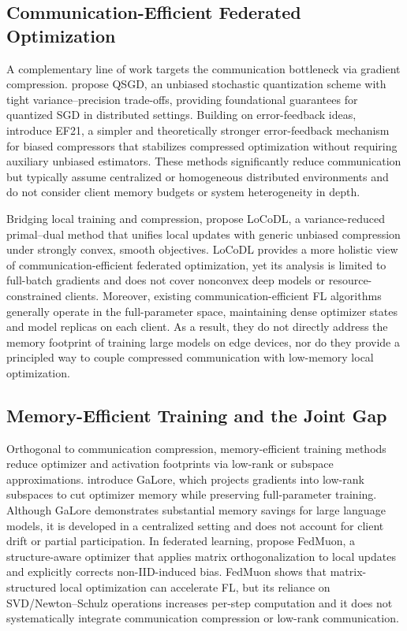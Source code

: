 \documentclass[11pt]{article}
\begin{document}
\subsection{Communication-Efficient Federated Optimization}

A complementary line of work targets the communication bottleneck via gradient compression. \citet{alistarh2016qsgd} propose QSGD, an unbiased stochastic quantization scheme with tight variance–precision trade-offs, providing foundational guarantees for quantized SGD in distributed settings. Building on error-feedback ideas, \citet{richtárik2021simpler} introduce EF21, a simpler and theoretically stronger error-feedback mechanism for biased compressors that stabilizes compressed optimization without requiring auxiliary unbiased estimators. These methods significantly reduce communication but typically assume centralized or homogeneous distributed environments and do not consider client memory budgets or system heterogeneity in depth.

Bridging local training and compression, \citet{condat2024locodl} propose LoCoDL, a variance-reduced primal–dual method that unifies local updates with generic unbiased compression under strongly convex, smooth objectives. LoCoDL provides a more holistic view of communication-efficient federated optimization, yet its analysis is limited to full-batch gradients and does not cover nonconvex deep models or resource-constrained clients. Moreover, existing communication-efficient FL algorithms generally operate in the full-parameter space, maintaining dense optimizer states and model replicas on each client. As a result, they do not directly address the memory footprint of training large models on edge devices, nor do they provide a principled way to couple compressed communication with low-memory local optimization.

\subsection{Memory-Efficient Training and the Joint Gap}

Orthogonal to communication compression, memory-efficient training methods reduce optimizer and activation footprints via low-rank or subspace approximations. \citet{zhao2024galore} introduce GaLore, which projects gradients into low-rank subspaces to cut optimizer memory while preserving full-parameter training. Although GaLore demonstrates substantial memory savings for large language models, it is developed in a centralized setting and does not account for client drift or partial participation. In federated learning, \citet{liu2025fedmuon} propose FedMuon, a structure-aware optimizer that applies matrix orthogonalization to local updates and explicitly corrects non-IID-induced bias. FedMuon shows that matrix-structured local optimization can accelerate FL, but its reliance on SVD/Newton–Schulz operations increases per-step computation and it does not systematically integrate communication compression or low-rank communication.
\end{document}
